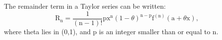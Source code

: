 The remainder term in a Taylor series can be written:
\[ \mathrm{R}_{\mathrm{n}} 
= \frac{1}{(\mathrm{n}-1)!} \mathrm{px}^{\mathrm{n}}(1- \theta) 
^{\mathrm{n-p}} \mathrm{f} ^{( \mathrm{n} ) } ( \mathrm{a} + \theta \mathrm{x} ) , \]
where theta lies in (0,1), and p is an integer smaller than or equal to n.